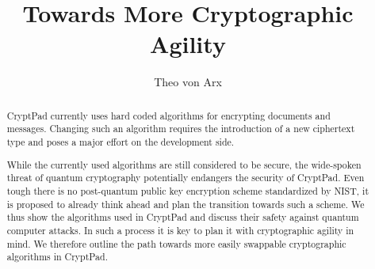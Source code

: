 \documentclass[a4paper, 11pt]{article}
\begin{document}


\newcommand{\myAlgofont}[1]{\ifmmode\mathsf{{#1}}\else\textsf{{#1}}\fi\xspace}
\newcommand{\myHash}[1]{\ensuremath{\myAlgofont{H}({#1})}}
\newcommand{\myKGen}[2][]{\ensuremath{\myAlgofont{KGen}\ifthenelse{\equal{#1}{}}{}{#1}({#2})}}
\newcommand{\mypwd}{\myAlgofont{pwd}}
\newcommand{\mychanID}{\myAlgofont{chanID}}
\newcommand{\myViewKeyStr}{\myAlgofont{viewKeyStr}}
\newcommand{\myEditKeyStr}{\myAlgofont{editKeyStr}}
\newcommand{\myPK}{\myAlgofont{PK}}
\newcommand{\mySK}{\myAlgofont{SK}}
\newcommand{\mySymKey}{\myAlgofont{K}}

\author{Theo von Arx}

\title{Towards More Cryptographic Agility}

\maketitle

\begin{abstract}
  CryptPad currently uses hard coded algorithms for encrypting documents and messages.
  Changing such an algorithm requires the introduction of a new ciphertext type and poses a major effort on the development side.

  While the currently used algorithms are still considered to be secure, the wide-spoken threat of quantum cryptography potentially endangers the security of CryptPad.
  Even tough there is no post-quantum public key encryption scheme standardized by \acs{NIST}, it is proposed to already think ahead and plan the transition towards such a scheme.
  We thus show the algorithms used in CryptPad and discuss their safety against quantum computer attacks.
  In such a process it is key to plan it with cryptographic agility in mind.
  We therefore outline the path towards more easily swappable cryptographic algorithms in CryptPad.
\end{abstract}
\end{document}
